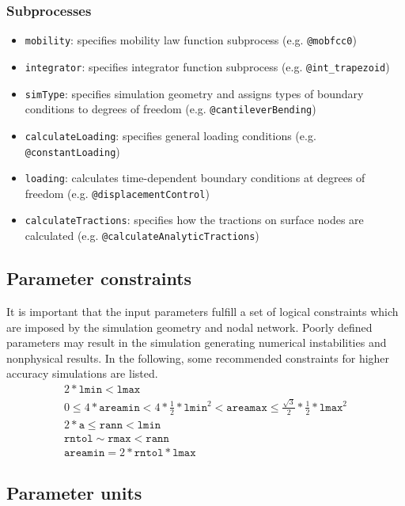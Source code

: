 \documentclass[a4paper,12pt]{article}
\begin{document}
\subsubsection*{Subprocesses}

\begin{itemize}
  \item \texttt{mobility}: specifies mobility law function subprocess (e.g. \texttt{@mobfcc0})
  \item \texttt{integrator}: specifies integrator function subprocess (e.g. \texttt{@int\_trapezoid})
  \item \texttt{simType}: specifies simulation geometry and assigns types of boundary conditions to degrees of freedom (e.g. \texttt{@cantileverBending})
  \item \texttt{calculateLoading}: specifies general loading conditions (e.g. \texttt{@constantLoading})
  \item \texttt{loading}: calculates time-dependent boundary conditions at degrees of freedom (e.g. \texttt{@displacementControl})
  \item \texttt{calculateTractions}: specifies how the tractions on surface nodes are calculated (e.g. \texttt{@calculateAnalyticTractions})
\end{itemize}
    
\subsection{Parameter constraints}
    
It is important that the input parameters fulfill a set of logical constraints which are imposed by the simulation geometry and nodal network. Poorly defined parameters may result in the simulation generating numerical instabilities and nonphysical results. In the following, some recommended constraints for higher accuracy simulations are listed.
\begin{gather}
2*\texttt{lmin} < \texttt{lmax} \\
0 \leq 4*\texttt{areamin} < 4*\frac{1}{2}*\texttt{lmin}^2 < \texttt{areamax} \leq \frac{\sqrt{3}}{2}*\frac{1}{2}*\texttt{lmax}^2 \\
2*\texttt{a} \leq \texttt{rann} < \texttt{lmin} \\
\texttt{rntol} \sim \texttt{rmax} < \texttt{rann} \\
\texttt{areamin} = 2*\texttt{rntol}*\texttt{lmax}
\end{gather}


\subsection{Parameter units}
\end{document}
